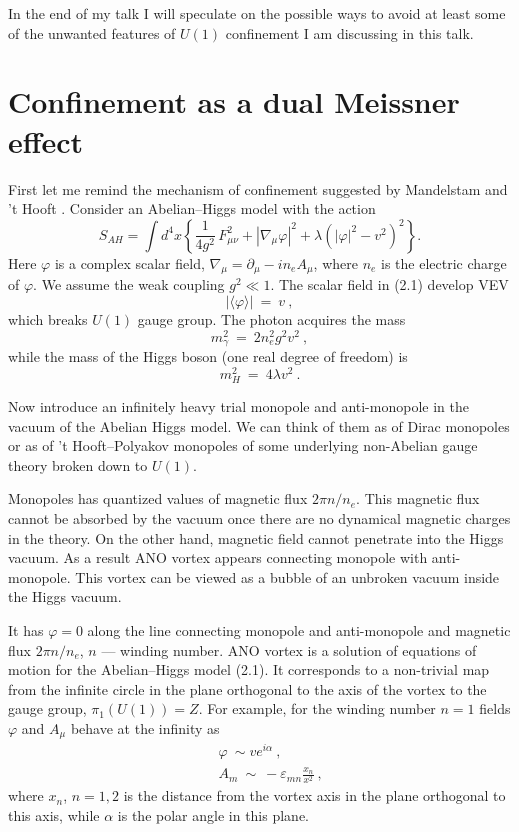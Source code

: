\documentclass[a4paper,12pt]{article}
\begin{document}
In the end of my talk I will  speculate on the possible ways to
avoid at least some of the unwanted features of
$U(1)$ confinement I am discussing in this talk.

\section{Confinement as a dual Meissner effect}
\setcounter{equation}{0}

First let me remind  the mechanism of confinement suggested by
Mandelstam and 't Hooft \cite{MH}. Consider an Abelian--Higgs
model with the action
\begin{equation}
S_{AH}=\int d^4x\left\{\frac1{4g^2}\,F^2_{\mu\nu}+|\nabla_\mu
\varphi|^2+\lambda(|\varphi|^2-v^2)^2\right\}.
\end{equation}
Here $\varphi$ is a complex scalar field,
$\nabla_\mu=\partial_\mu-in_eA_\mu$, where $n_e$ is the electric
charge of $\varphi$. We assume the weak coupling $g^2\ll1$. The
scalar field in (2.1) develop VEV
\begin{equation}
|\langle\varphi\rangle |\ =\ v\ ,
\end{equation}
which breaks $U(1)$ gauge group. The photon acquires the mass
\begin{equation}
m^2_\gamma\ =\ 2n^2_eg^2v^2\ ,
\end{equation}
while the mass of the Higgs boson (one real degree of freedom)
is
\begin{equation}
m^2_H\ =\ 4\lambda v^2\ .
\end{equation}

Now introduce an infinitely heavy trial monopole and
anti-monopole in the vacuum of the Abelian Higgs model. We can
think of them as of Dirac monopoles or as of 't Hooft--Polyakov
monopoles of some underlying non-Abelian gauge theory broken
down to $U(1)$.

Monopoles has quantized values of magnetic flux $2\pi n/n_e$.
This magnetic flux cannot  be absorbed by the vacuum once there
are no dynamical magnetic charges in the theory.
 On the other hand, magnetic field cannot penetrate into the Higgs
vacuum. As a result ANO vortex appears \cite{ANO} connecting
monopole with anti-monopole. This vortex can be viewed as a 
bubble of an unbroken vacuum inside the Higgs vacuum.

It has $\varphi=0$ along the line connecting monopole and
anti-monopole and magnetic flux $2\pi n/n_e$, $n$ --- winding
number. ANO vortex is a solution of equations of motion for the
Abelian--Higgs model (2.1). It corresponds to a non-trivial map
from the infinite circle in the plane orthogonal to the axis of
the vortex to the gauge group, $\pi_1(U(1))=Z$. For example, for
the winding number $n=1$ fields $\varphi$ and $A_\mu$ behave at
the infinity as
\begin{eqnarray}
&& \varphi\ \sim v e^{i\alpha}\ , \nonumber\\
&& A_m\ \sim\ -\varepsilon_{mn}\frac{x_n}{x^2}\ ,
\end{eqnarray}
where $x_n$, $n=1,2$ is the distance from the vortex axis in the
plane orthogonal to this axis, while $\alpha$ is the polar angle
in this plane.
\end{document}
